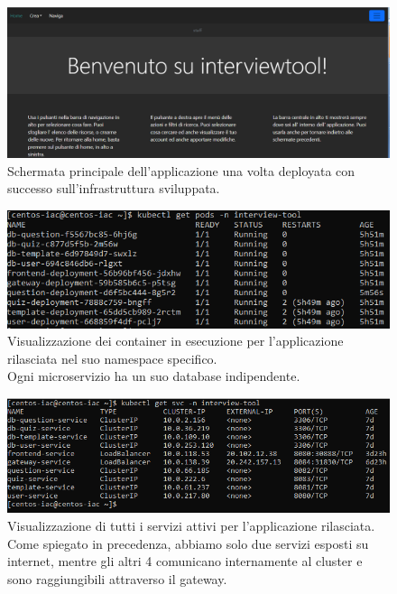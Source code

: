 \documentclass[a4paper,12pt]{report}
\begin{document}
\begin{figure}[h]
	\includegraphics[width=1.0\textwidth]{app_micro}
    \caption{Schermata principale dell'applicazione una volta deployata con successo sull'infrastruttura sviluppata.}
    \label{fig:app_micro}
\end{figure}
\begin{figure}[h]
	\includegraphics[width=1.0\textwidth]{app_micro2}
    \caption{Visualizzazione dei container in esecuzione per l'applicazione rilasciata nel suo namespace specifico. \\Ogni microservizio ha un suo database indipendente.}
    \label{fig:app_micro2}
\end{figure}
\begin{figure}[h]
	\includegraphics[width=1.0\textwidth]{app_micro3}
    \caption{Visualizzazione di tutti i servizi attivi per l'applicazione rilasciata.\\Come spiegato in precedenza, abbiamo solo due servizi esposti su internet, mentre gli altri 4 comunicano internamente al cluster e sono raggiungibili attraverso il gateway.}
    \label{fig:app_micro3}
\end{figure} \leavevmode \\ \\ \\ \\ \\ \\ \\ \\ \\ \\ \\ \\ \\ 
\end{document}
